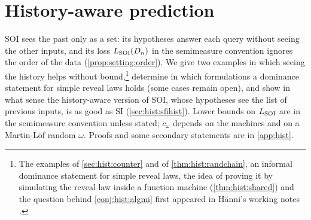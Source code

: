 \section{History-aware prediction}\label{sec:hist}

SOI sees the past only as a set: its hypotheses answer each query without seeing the other inputs, and its loss $L_{\mathrm{SOI}}(D_n)$ in the semimeasure convention ignores the order of the data (\cref{prop:setting:order}). We give two examples in which seeing the history helps without bound,\footnote{The examples of \cref{sec:hist:counter} and of \cref{thm:hist:randchain}, an informal dominance statement for simple reveal laws, the idea of proving it by simulating the reveal law inside a function machine (\cref{thm:hist:shared}) and the question behind \cref{conj:hist:algmi} first appeared in H\"anni's working notes \citep{hanni2026notes}.} determine in which formulations a dominance statement for simple reveal laws holds (some cases remain open), and show in what sense the history-aware version of SOI, whose hypotheses see the list of previous inputs, is as good as SI (\cref{sec:hist:sfihist}). Lower bounds on $L_{\mathrm{SOI}}$ are in the semimeasure convention unless stated; $c_\omega$ depends on the machines and on a Martin-L\"of random $\omega$. Proofs and some secondary statements are in \cref{app:hist}.

